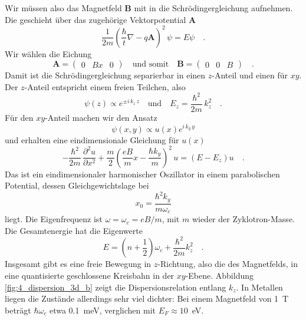 Wir müssen also das Magnetfeld $\mathbf{B}$ mit in die Schrödingergleichung aufnehmen. Die geschieht über das zugehörige Vektorpotential $\mathbf{A}$ 
\begin{equation}
   \frac{1}{2m} \left( \frac{\hbar}{t} \nabla - q \mathbf{A}  \right)^2 \, \psi = E \psi \quad .
\end{equation}
Wir wählen die Eichung
\begin{equation}
   \mathbf{A} = \begin{pmatrix}
      0 & B x & 0
   \end{pmatrix}
   \quad \text{und somit} \quad
   \mathbf{B} = \begin{pmatrix}
      0 & 0 & B
   \end{pmatrix} \quad .
\end{equation}
Damit ist die Schrödingergleichung separierbar in einen $z$-Anteil und einen für $xy$. Der $z$-Anteil entspricht einem freien Teilchen, also 
\begin{equation}
    \psi(z) \propto e^{ \pm i \, k_z \, z}    \quad \text{und} \quad
    E_z = \frac{\hbar^2}{2m} \, k_z^2 \quad .
\end{equation}
Für den $xy$-Anteil machen wir den Ansatz
\begin{equation}
   \psi(x,y) \propto u(x) e^{i \, k_y \, y}
\end{equation}
und erhalten eine eindimensionale Gleichung für $u(x)$
\begin{equation}
   - \frac{\hbar^2}{2m} \, \frac{\partial^2 u }{\partial x^2} + 
   \frac{m}{2} \left(
 \frac{eB}{m} x - \frac{\hbar k_y}{m}
   \right)^2 \, u = 
   (E - E_z) u \quad .
\end{equation}
Das ist ein eindimensionaler harmonischer Oszillator in einem parabolischen Potential,  dessen Gleichgewichtslage bei 
\begin{equation}
   x_0 = \frac{\hbar^2 k_y}{m \omega_c}
\end{equation}
liegt. Die Eigenfrequenz ist $\omega = \omega_c = e B / m$, mit $m$ wieder der Zyklotron-Masse. 
Die Gesamtenergie hat die Eigenwerte
\begin{equation}
   E = \left( n + \frac{1}{2} \right) \omega_c + \frac{\hbar^2}{2m} k_z^2 \quad .
\end{equation}
Insgesamt gibt es eine freie Bewegung in $z$-Richtung, also die des Magnetfelds, in eine quantisierte geschlossene Kreisbahn in der $xy$-Ebene. Abbildung \ref{fig:4_dispersion_3d_b} zeigt die Dispersionsrelation entlang $k_z$. In Metallen liegen die Zustände allerdings sehr viel dichter: Bei einem Magnetfeld von 1~T beträgt $\hbar \omega_c$ etwa 0.1~meV, verglichen mit $E_F \approx 10$~eV.

